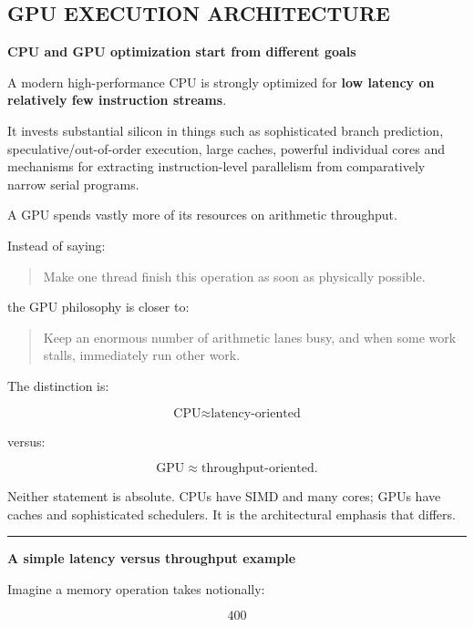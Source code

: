 \subsection{GPU EXECUTION ARCHITECTURE}\label{03-visual-computing-i-ch015-gpu-execution-architecture}

\hypertarget{03-visual-computing-i-ch015-gpu-execution-architecture}{}

\textbf{CPU and GPU optimization start from different goals}

A modern high-performance CPU is strongly optimized for \textbf{low latency on relatively few instruction streams}.

It invests substantial silicon in things such as sophisticated branch prediction, speculative/out-of-order execution, large caches, powerful individual cores and mechanisms for extracting instruction-level parallelism from comparatively narrow serial programs.

A GPU spends vastly more of its resources on arithmetic throughput.

Instead of saying:

\begin{quote}
Make one thread finish this operation as soon as physically possible.
\end{quote}

the GPU philosophy is closer to:

\begin{quote}
Keep an enormous number of arithmetic lanes busy, and when some work stalls, immediately run other work.
\end{quote}

The distinction is:

\[
\boxed{
\text{CPU}\approx\text{latency-oriented}
}
\]

versus:

\[
\boxed{
\text{GPU}\approx\text{throughput-oriented}.
}
\]

Neither statement is absolute. CPUs have SIMD and many cores; GPUs have caches and sophisticated schedulers. It is the architectural emphasis that differs.

\begin{center}\rule{0.5\linewidth}{0.5pt}\end{center}

\textbf{A simple latency versus throughput example}

Imagine a memory operation takes notionally:

\[
400
\]

